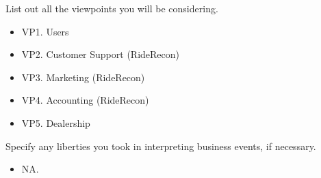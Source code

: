 \documentclass[]{article}
\begin{document}
 List out all the viewpoints you will be considering.\\
\begin{itemize}
	\item VP1. Users
	\item VP2. Customer Support (RideRecon)
	\item VP3. Marketing (RideRecon)
	\item VP4. Accounting (RideRecon)
	\item VP5. Dealership
\end{itemize}

 Specify any liberties you took in interpreting business events, if necessary.\\
\begin{itemize}
	\item NA.
\end{itemize}
\end{document}
